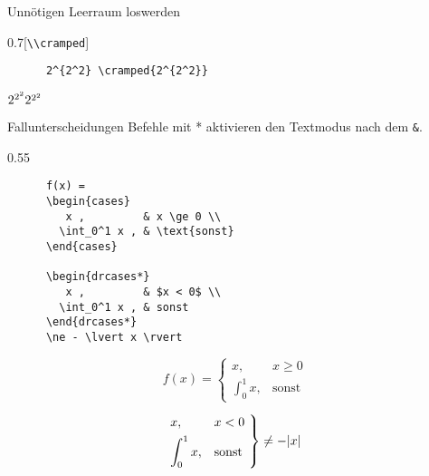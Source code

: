 \begin{frame}[fragile]{Unnötigen Leerraum loswerden}
  \begin{CodeExample}{0.7}[\lstinline+\\cramped+]
    \begin{lstlisting}
      2^{2^2} \cramped{2^{2^2}}
    \end{lstlisting}
  \CodeResult
    $2^{2^2} \cramped{2^{2^2}}$
  \end{CodeExample}
  
\end{frame}

\begin{frame}[fragile]{Fallunterscheidungen}
  Befehle mit * aktivieren den Textmodus nach dem \lstinline+&+.
  \begin{CodeExample}{0.55}
    \begin{lstlisting}
      f(x) =
      \begin{cases}
         x ,         & x \ge 0 \\
        \int_0^1 x , & \text{sonst}
      \end{cases}

      \begin{drcases*}
         x ,         & $x < 0$ \\
        \int_0^1 x , & sonst
      \end{drcases*}
      \ne - \lvert x \rvert
    \end{lstlisting}
  \CodeResult
    \removedisplayskip
    \begin{equation*}
      f(x) =
      \begin{cases}
         x ,         & x \ge 0 \\
        \int_0^1 x , & \text{sonst}
      \end{cases}
    \end{equation*}

    \vspace{3em}
    \begin{equation*}
      \begin{drcases*}
         x ,         & $x < 0$ \\
        \int_0^1 x , & sonst
      \end{drcases*}
      \ne - \lvert x \rvert
    \end{equation*}
  \end{CodeExample}
\end{frame}

